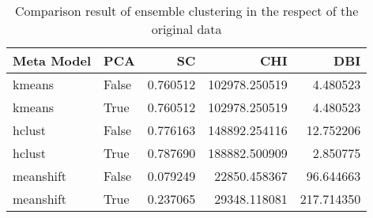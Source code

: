 \begin{table}[t]
\centering
\caption{Comparison result of ensemble clustering in the respect of the original data }
\label{tbl:meta_clustering_score_results_respect_original}
\begin{tabular}{llrrr}
\toprule
Meta Model &   PCA &       SC &           CHI &        DBI \\
\midrule
    kmeans & False & 0.760512 & 102978.250519 &   4.480523 \\
    kmeans &  True & 0.760512 & 102978.250519 &   4.480523 \\
    hclust & False & 0.776163 & 148892.254116 &  12.752206 \\
    hclust &  True & 0.787690 & 188882.500909 &   2.850775 \\
 meanshift & False & 0.079249 &  22850.458367 &  96.644663 \\
 meanshift &  True & 0.237065 &  29348.118081 & 217.714350 \\
\bottomrule
\end{tabular}
\end{table}
